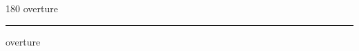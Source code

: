 
\begin{frame}
\begin{center}
\begin{turn}{180}
{\fontsize{2.5cm}{1em}\selectfont overture}
\end{turn}
\vspace{1em}\par  
\hrule
\vspace{1em}\par  
{\fontsize{2.5cm}{1em}\selectfont overture}
\end{center}
\end{frame}
